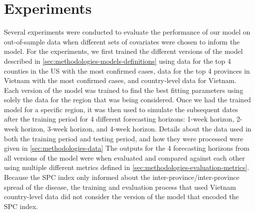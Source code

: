 \section{Experiments}

Several experiments were conducted to evaluate the performance of our model on out-of-sample data when different sets of covariates were chosen to inform the model.
For the experiments, we first trained the different versions of the model described in \autoref{sec:methodologies-models-definitions} using data for the top 4 counties in the \gls{US} with the most confirmed cases, data for the top 4 provinces in Vietnam with the most confirmed cases, and country-level data for Vietnam.
Each version of the model was trained to find the best fitting parameters using solely the data for the region that was being considered.
Once we had the trained model for a specific region, it was then used to simulate the subsequent dates after the training period for 4 different forecasting horizons: 1-week horizon, 2-week horizon, 3-week horizon, and 4-week horizon.
Details about the data used in both the training period and testing period, and how they were processed were given in \autoref{sec:methodologies-data}
The outputs for the 4 forecasting horizons from all versions of the model were when evaluated and compared against each other using multiple different metrics defined in \autoref{sec:methodologies-evaluation-metrics}.
Because the \gls{SPC} index \cite{kuchlerGeographicSpreadCOVID192020} only informed about the inter-province/inter-province spread of the disease, the training and evaluation process that used Vietnam country-level data did not consider the version of the model that encoded the \gls{SPC} index.
